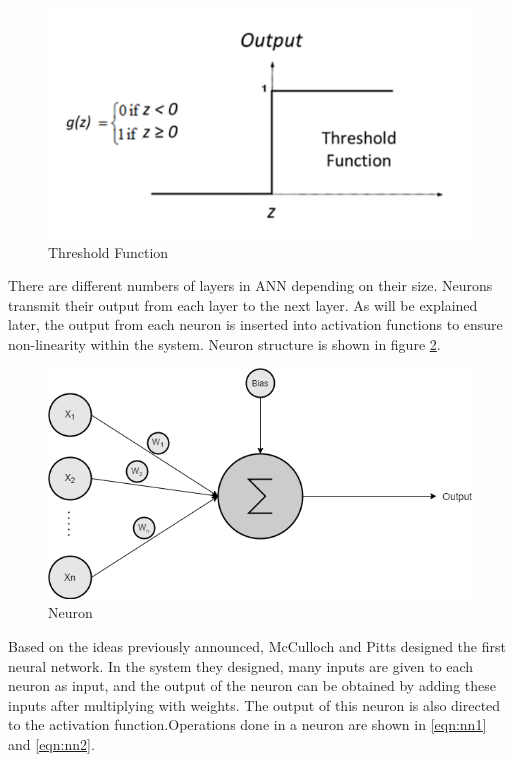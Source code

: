 \begin{figure}[h]
    \centering
    \includegraphics[scale=0.7]{figures/chapter3/threshol.png}
    \caption{Threshold Function}
    \label{fig:threshold}
\end{figure}

There are different numbers of layers in ANN depending on their size. Neurons transmit their output from each layer to the next layer. As will be explained later, the output from each neuron is inserted into activation functions to ensure non-linearity within the system. Neuron structure is shown in figure \ref{fig:neuron_drawl}.

\begin{figure}[h]
    \centering
    \includegraphics[scale=0.5]{figures/chapter3/neuron.png}
    \caption{Neuron}
    \label{fig:neuron_drawl}
\end{figure}

Based on the ideas previously announced, McCulloch and Pitts designed the first neural network. In the system they designed, many inputs are given to each neuron as input, and the output of the neuron can be obtained by adding these inputs after multiplying with weights. The output of this neuron is also directed to the activation function.Operations done in a neuron are shown in \ref{eqn:nn1} and \ref{eqn:nn2}.

